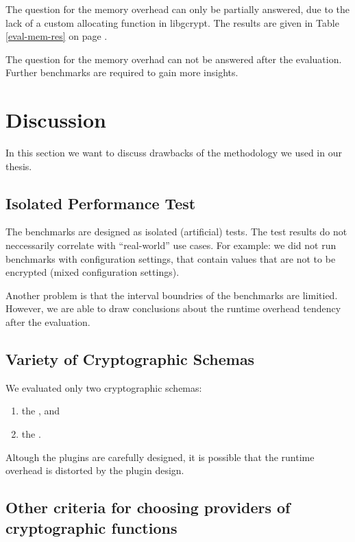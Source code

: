 

The question for the memory overhead can only be partially answered, due to the lack of a custom allocating function in libgcrypt.
The results are given in Table \ref{eval-mem-res} on page \pageref{eval-mem-res}.



The question for the memory overhad can not be answered after the evaluation.
Further benchmarks are required to gain more insights.

\section{Discussion}

In this section we want to discuss drawbacks of the methodology we used in our thesis.

	\subsection{Isolated Performance Test}

The benchmarks are designed as isolated (artificial) tests.
The test results do not neccessarily correlate with ``real-world'' use cases.
For example: we did not run benchmarks with configuration settings, that contain values that are not to be encrypted (mixed configuration settings).

Another problem is that the interval boundries of the benchmarks are limitied.
However, we are able to draw conclusions about the runtime overhead tendency after the evaluation.

	\subsection{Variety of Cryptographic Schemas}

We evaluated only two cryptographic schemas:
\begin{enumerate}
\item the \crypto, and
\item the \fcrypt.
\end{enumerate}

Altough the plugins are carefully designed, it is possible that the runtime overhead is distorted by the plugin design.

	\subsection{Other criteria for choosing providers of cryptographic functions}

